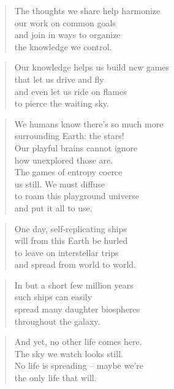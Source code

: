 \documentclass[10pt,a4paper]{article}
\begin{document}
\begin{multicols}{2}
\begin{verse}
The thoughts we share help harmonize\\
our work on common goals\\
and join in ways to organize\\
the knowledge we control.
\end{verse}

\begin{verse}
Our knowledge helps us build new games\\
that let us drive and fly\\
and even let us ride on flames\\
to pierce the waiting sky.
\end{verse}

\begin{verse}
We humans know there’s so much more\\
surrounding Earth: the stars!\\
Our playful brains cannot ignore\\
how unexplored those are.
\\
The games of entropy coerce\\
us still. We must diffuse\\
to roam this playground universe\\
and put it all to use.
\end{verse}

\begin{verse}
One day, self-replicating ships\\
will from this Earth be hurled\\
to leave on interstellar trips\\
and spread from world to world.
\end{verse}

\begin{verse}
In but a short few million years\\
such ships can easily\\
spread many daughter biospheres\\
throughout the galaxy.
\end{verse}

\begin{verse}
And yet, no other life comes here.\\
The sky we watch looks still.\\
No life is spreading – maybe we’re\\
the only life that will.
\end{verse}


\end{multicols}
\end{document}
